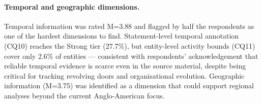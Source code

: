 \vspace{-0.2cm}\paragraph{Temporal and geographic dimensions.} 
Temporal information was rated M=3.88 and flagged by half the respondents as one of the hardest dimensions to find. Statement-level temporal annotation (CQ10) reaches the Strong tier (27.7\%), but entity-level activity bounds (CQ11) cover only 2.6\% of entities --- consistent with respondents' acknowledgement that reliable temporal evidence is scarce even in the source material, despite being critical for tracking revolving doors and organisational evolution.
Geographic information (M=3.75) was identified as a dimension that could support regional analyses beyond the current Anglo-American focus.

